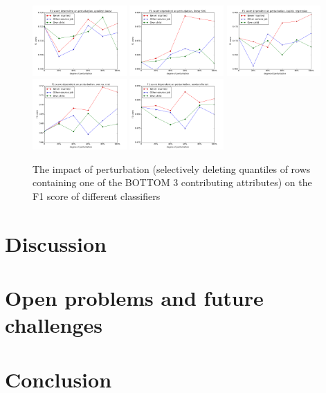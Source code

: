 \documentclass{llncs}
\begin{document}
\begin{figure}[H]
	\begin{center}
		\includegraphics[width=0.32\textwidth]{figures/results/perturb_gradient_boost_bottom}
		\includegraphics[width=0.32\textwidth]{figures/results/perturb_linear_svc_bottom}
		\includegraphics[width=0.32\textwidth]{figures/results/perturb_logistic_regression_bottom}
		\includegraphics[width=0.32\textwidth]{figures/results/perturb_onevsrest_bagging_bottom}
		\includegraphics[width=0.32\textwidth]{figures/results/perturb_random_forest_bottom}
		\caption{The impact of perturbation (selectively deleting quantiles of rows containing one of the BOTTOM 3 contributing attributes) on the F1 score of different classifiers}
		\label{fig:adult_results_perturbation_top}
	\end{center}
\end{figure}



\section{Discussion}
\label{sect:discussion}


\section{Open problems and future challenges}
\label{sect:op_fc}


\section{Conclusion}
\label{sect:conclusion}



\newpage



\end{document}
